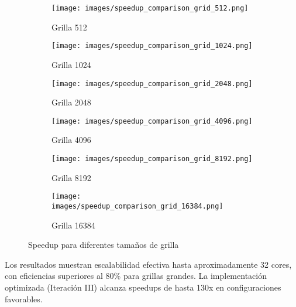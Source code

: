 \documentclass[12pt, A4]{article}
\begin{document}
\begin{figure}[H]
    \centering

    \begin{subfigure}{0.48\textwidth}
        \centering
        \texttt{[image: images/speedup\_comparison\_grid\_512.png]}
        \caption{Grilla 512}
        \label{fig:speedup_512}
    \end{subfigure}\hspace*{\fill}
    \begin{subfigure}{0.48\textwidth}
        \centering
        \texttt{[image: images/speedup\_comparison\_grid\_1024.png]}
        \caption{Grilla 1024}
        \label{fig:speedup_1024}
    \end{subfigure}

    \medskip

    \begin{subfigure}{0.48\textwidth}
        \centering
        \texttt{[image: images/speedup\_comparison\_grid\_2048.png]}
        \caption{Grilla 2048}
        \label{fig:speedup_2048}
    \end{subfigure}\hspace*{\fill}
    \begin{subfigure}{0.48\textwidth}
        \centering
        \texttt{[image: images/speedup\_comparison\_grid\_4096.png]}
        \caption{Grilla 4096}
        \label{fig:speedup_4096}
    \end{subfigure}

    \medskip

    \begin{subfigure}{0.48\textwidth}
        \centering
        \texttt{[image: images/speedup\_comparison\_grid\_8192.png]}
        \caption{Grilla 8192}
        \label{fig:speedup_8192}
    \end{subfigure}\hspace*{\fill}
    \begin{subfigure}{0.48\textwidth}
        \centering
        \texttt{[image: images/speedup\_comparison\_grid\_16384.png]}
        \caption{Grilla 16384}
        \label{fig:speedup_16384}
    \end{subfigure}

    \caption{Speedup para diferentes tamaños de grilla}
\end{figure}

Los resultados muestran escalabilidad efectiva hasta aproximadamente 32 cores, con eficiencias superiores al 80\% para grillas grandes. La implementación optimizada (Iteración III) alcanza speedups de hasta 130x en configuraciones favorables.
\end{document}
